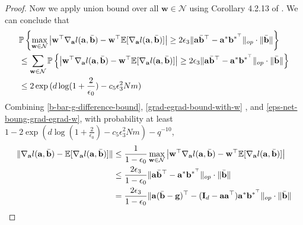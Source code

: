 \documentclass{article}
\theoremstyle{plain}
\theoremstyle{definition}
\theoremstyle{remark}
\begin{document}
\begin{proof}
Now we apply union bound over all $\mathbf{w} \in \mathcal{N}$ using Corollary 4.2.13 of \cite{vershynin2018high}. We can conclude that 
\begin{align}
    &\mathbb{P}  \left\{ \max_{\mathbf w \in \mathcal N}   \left|\mathbf{w}^\top\nabla_{\mathbf{a}}l(\mathbf{a},\Bar{\mathbf{b}})-\mathbf{w}^\top\mathbb{E}[\nabla_{\mathbf{a}}l(\mathbf{a},\Bar{\mathbf{b}})]\right|\geq 2\epsilon_3 \lVert \mathbf{a}\Bar{\mathbf{b}}^\top-\mathbf{a}^* \mathbf{b}^{*^\top} \rVert_{op} \cdot \lVert \Bar{\mathbf{b}} \rVert  \right\} \label{eps-net-boung-grad-egrad-w}\\
     &\leq \sum_{\mathbf w \in \mathcal N} \mathbb{P}  \left\{   \left|\mathbf{w}^\top\nabla_{\mathbf{a}}l(\mathbf{a},\Bar{\mathbf{b}})-\mathbf{w}^\top\mathbb{E}[\nabla_{\mathbf{a}}l(\mathbf{a},\Bar{\mathbf{b}})]\right|\geq 2\epsilon_3 \lVert \mathbf{a}\Bar{\mathbf{b}}^\top-\mathbf{a}^* \mathbf{b}^{*^\top} \rVert_{op} \cdot \lVert \Bar{\mathbf{b}} \rVert   \right\}\\
    & \leq 2 \exp{(d\log(1+\frac{2}{\epsilon_0})-c_5\epsilon_3^2Nm)}
\end{align}
Combining \eqref{b-bar-g-difference-bound}, \eqref{grad-egrad-bound-with-w} , and \eqref{eps-net-boung-grad-egrad-w}, with probability at least $1-2 \exp{(d\log(1+\frac{2}{\epsilon_0})-c_5\epsilon_3^2Nm)}-q^{-10}$,
\begin{align}
\lVert  \nabla_{\mathbf{a}}l(\mathbf{a},\Bar{\mathbf{b}})-\mathbb{E}[\nabla_{\mathbf{a}}l(\mathbf{a},\Bar{\mathbf{b}})]\rVert &\leq \frac{1}{1-\epsilon_0} \max_{\mathbf{w}\in \mathcal{N}} \left|\mathbf{w}^\top\nabla_{\mathbf{a}}l(\mathbf{a},\Bar{\mathbf{b}})-\mathbf{w}^\top\mathbb{E}[\nabla_{\mathbf{a}}l(\mathbf{a},\Bar{\mathbf{b}})]\right| \\
   &\leq \frac{2\epsilon_3}{1-\epsilon_0} \lVert\mathbf{a}\Bar{\mathbf{b}}^\top-\mathbf{a}^* \mathbf{b}^{*^\top} \rVert_{op} \cdot \lVert \Bar{\mathbf{b}} \rVert \label{grad-egrad-4} \\
    & = \frac{2\epsilon_3}{1-\epsilon_0}  \| \mathbf{a}(\Bar{\mathbf{b}}-\mathbf{g})^\top - (\mathbf{I}_d-\mathbf{a}\mathbf{a}^\top)\mathbf{a}^*\mathbf{b}^{*^\top} \|_{op} \cdot \lVert \Bar{\mathbf{b}} \rVert

\end{align}
\end{proof}
\end{document}
